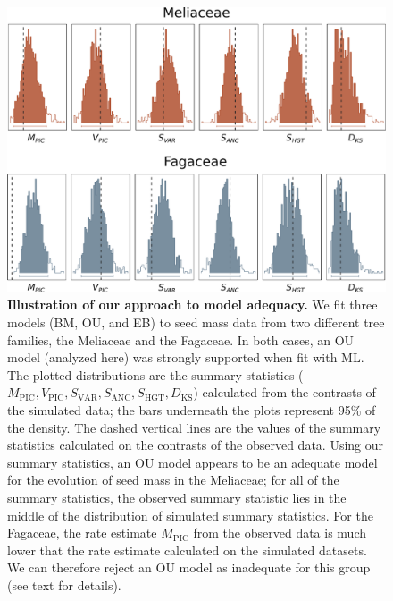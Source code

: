 \documentclass[a4paper,12pt]{article}
\begin{document}
\begin{figure}[p]
  \centering
  \includegraphics[scale=0.5]{figs/two-clade-example}
  \caption{\textbf{Illustration of our approach to model adequacy.} We fit three models (BM, OU, and EB) to seed mass data from two different tree families, the Meliaceae and the Fagaceae. In both cases, an OU model (analyzed here) was strongly supported when fit with ML. The plotted distributions are the summary statistics ($M_{\text{PIC}}, V_{\text{PIC}}, S_{\text{VAR}}, S_{\text{ANC}}, S_{\text{HGT}}, D_{\text{KS}}$) calculated from the contrasts of the simulated data; the bars underneath the plots represent 95\% of the density. The dashed vertical lines are the values of the summary statistics calculated on the contrasts of the observed data. Using our summary statistics, an OU model appears to be an adequate model for the evolution of seed mass in the Meliaceae; for all of the summary statistics, the observed summary statistic lies in the middle of the distribution of simulated summary statistics. For the Fagaceae, the rate estimate $M_{\text{PIC}}$ from the observed data is much lower that the rate estimate calculated on the simulated datasets. We can therefore reject an OU model as inadequate for this group (see text for details).}
  \label{fig:two-clades}
\end{figure}
\end{document}
